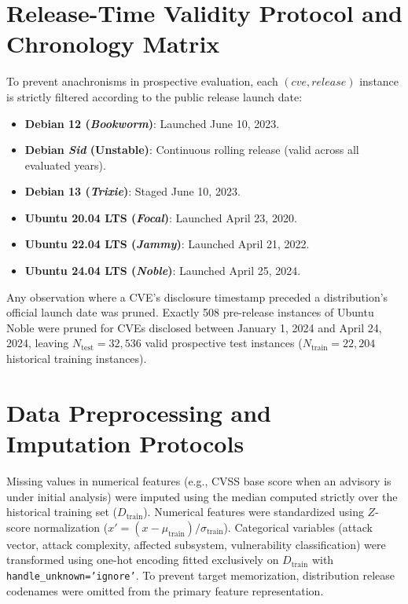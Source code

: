 \documentclass[final,5p,times,twocolumn]{elsarticle}
\begin{document}
\section{Release-Time Validity Protocol and Chronology Matrix}
\label{app:release_validity}
To prevent anachronisms in prospective evaluation, each $(cve, release)$ instance is strictly filtered according to the public release launch date:
\begin{itemize}
\item \textbf{Debian 12 (\textit{Bookworm})}: Launched June 10, 2023.
\item \textbf{Debian \textit{Sid} (Unstable)}: Continuous rolling release (valid across all evaluated years).
\item \textbf{Debian 13 (\textit{Trixie})}: Staged June 10, 2023.
\item \textbf{Ubuntu 20.04 LTS (\textit{Focal})}: Launched April 23, 2020.
\item \textbf{Ubuntu 22.04 LTS (\textit{Jammy})}: Launched April 21, 2022.
\item \textbf{Ubuntu 24.04 LTS (\textit{Noble})}: Launched April 25, 2024.
\end{itemize}
Any observation where a CVE's disclosure timestamp preceded a distribution's official launch date was pruned. Exactly 508 pre-release instances of Ubuntu Noble were pruned for CVEs disclosed between January 1, 2024 and April 24, 2024, leaving $N_{\text{test}} = 32,536$ valid prospective test instances ($N_{\text{train}} = 22,204$ historical training instances).

\section{Data Preprocessing and Imputation Protocols}
\label{app:preprocessing}
Missing values in numerical features (e.g., CVSS base score when an advisory is under initial analysis) were imputed using the median computed strictly over the historical training set ($D_{\text{train}}$). Numerical features were standardized using $Z$-score normalization ($x' = (x - \mu_{\text{train}}) / \sigma_{\text{train}}$). Categorical variables (attack vector, attack complexity, affected subsystem, vulnerability classification) were transformed using one-hot encoding fitted exclusively on $D_{\text{train}}$ with \texttt{handle\_unknown='ignore'}. To prevent target memorization, distribution release codenames were omitted from the primary feature representation.
\end{document}
